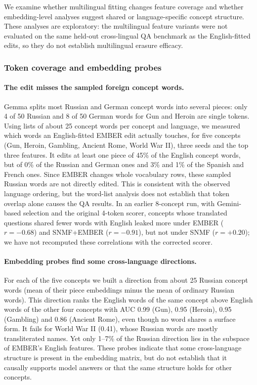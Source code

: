 \documentclass[11pt]{article}
\begin{document}
We examine whether multilingual fitting changes feature coverage and whether embedding-level analyses suggest shared or language-specific concept structure. These analyses are exploratory: the multilingual feature variants were not evaluated on the same held-out cross-lingual QA benchmark as the English-fitted edits, so they do not establish multilingual erasure efficacy.

\subsubsection{Token coverage and embedding probes}
\paragraph{The edit misses the sampled foreign concept words.}
Gemma splits most Russian and German concept words into several pieces: only 4 of 50 Russian and 8 of 50 German words for Gun and Heroin are single tokens.
Using lists of about 25 concept words per concept and language, we measured which words an English-fitted EMBER edit actually touches, for five concepts (Gun, Heroin, Gambling, Ancient Rome, World War II), three seeds and the top three features.
It edits at least one piece of 45\% of the English concept words, but of 0\% of the Russian and German ones and 3\% and 1\% of the Spanish and French ones.
Since EMBER changes whole vocabulary rows, these sampled Russian words are not directly edited. This is consistent with the observed language ordering, but the word-list analysis does not establish that token overlap alone causes the QA results.
In an earlier 8-concept run, with Gemini-based selection and the original 4-token scorer, concepts whose translated questions shared fewer words with English leaked more under EMBER ($r = -0.68$) and SNMF+EMBER ($r = -0.91$), but not under SNMF ($r = +0.20$); we have not recomputed these correlations with the corrected scorer.

\paragraph{Embedding probes find some cross-language directions.}
For each of the five concepts we built a direction from about 25 Russian concept words (mean of their piece embeddings minus the mean of ordinary Russian words).
This direction ranks the English words of the same concept above English words of the other four concepts with AUC 0.99 (Gun), 0.95 (Heroin), 0.95 (Gambling) and 0.86 (Ancient Rome), even though no word shares a surface form.
It fails for World War II (0.41), whose Russian words are mostly transliterated names.
Yet only 1--7\% of the Russian direction lies in the subspace of EMBER's English features.
These probes indicate that some cross-language structure is present in the embedding matrix, but do not establish that it causally supports model answers or that the same structure holds for other concepts.
\end{document}
